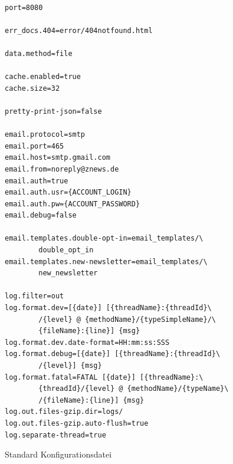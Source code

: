 \documentclass[12pt]{article}
\begin{document}
    \begin{figure}[p]
        \centering
        \begin{lstlisting}[frame=single,language=incomplete-Ini]%formatter:off

port=8080

err_docs.404=error/404notfound.html

data.method=file

cache.enabled=true
cache.size=32

pretty-print-json=false

email.protocol=smtp
email.port=465
email.host=smtp.gmail.com
email.from=noreply@znews.de
email.auth=true
email.auth.usr={ACCOUNT_LOGIN}
email.auth.pw={ACCOUNT_PASSWORD}
email.debug=false

email.templates.double-opt-in=email_templates/\
        double_opt_in
email.templates.new-newsletter=email_templates/\
        new_newsletter

log.filter=out
log.format.dev=[{date}] [{threadName}:{threadId}\
        /{level} @ {methodName}/{typeSimpleName}/\
        {fileName}:{line}] {msg}
log.format.dev.date-format=HH:mm:ss:SSS
log.format.debug=[{date}] [{threadName}:{threadId}\
        /{level}] {msg}
log.format.fatal=FATAL [{date}] [{threadName}:\
        {threadId}/{level} @ {methodName}/{typeName}\
        /{fileName}:{line}] {msg}
log.out.files-gzip.dir=logs/
log.out.files-gzip.auto-flush=true
log.separate-thread=true
        \end{lstlisting}%
        \caption{\label{fig:config-std}Standard Konfigurationsdatei}
    \end{figure}


\end{document}
